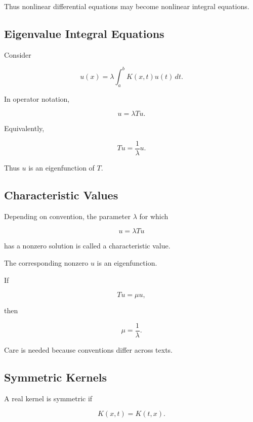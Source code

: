Thus nonlinear differential equations may become nonlinear integral
equations.

\subsection{Eigenvalue Integral Equations}
\label{subsec:eigenvalue-integral-equations}

Consider

\[
\boxed{
u(x)
=
\lambda
\int_a^b
K(x,t)u(t)\,dt.
}
\]

In operator notation,

\[
\boxed{
u=\lambda Tu.
}
\]

Equivalently,

\[
\boxed{
Tu
=
\frac1\lambda u.
}
\]

Thus \(u\) is an eigenfunction of \(T\).

\subsection{Characteristic Values}
\label{subsec:characteristic-values-integral-equations}

Depending on convention, the parameter \(\lambda\) for which

\[
u
=
\lambda Tu
\]

has a nonzero solution is called a characteristic value.

The corresponding nonzero \(u\) is an eigenfunction.

If

\[
Tu=\mu u,
\]

then

\[
\boxed{
\mu=\frac1\lambda.
}
\]

Care is needed because conventions differ across texts.

\subsection{Symmetric Kernels}
\label{subsec:symmetric-integral-kernels}

A real kernel is symmetric if

\[
\boxed{
K(x,t)
=
K(t,x).
}
\]

